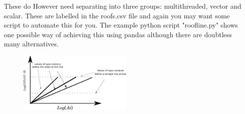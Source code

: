 \documentclass[a4paper, 11pt]{article}
\begin{document}
These do However need separating into three groups: multithreaded, vector and scalar. These are labelled in the roofs.csv file and again you may want some script to automate this for you. The example python script "roofline.py" shows one possible way of achieving this using pandas although there are doubtless many alternatives.

\begin{figure}
    \centering
    \includegraphics[width=0.5\textwidth]{roofline.png}
    \caption{\label{roofline}}
\end{figure}
\end{document}
